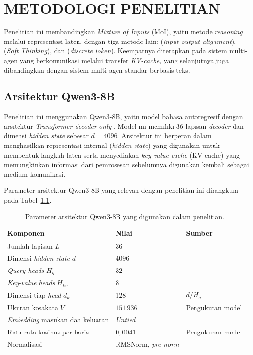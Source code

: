 \chapter{METODOLOGI PENELITIAN}

Penelitian ini membandingkan \textit{Mixture of Inputs} (MoI), yaitu
metode \textit{reasoning} melalui representasi laten, dengan tiga metode
lain:  (\textit{input-output alignment}), 
(\textit{Soft Thinking}), dan  (\textit{discrete token}). Keempatnya
diterapkan pada sistem multi-agen yang berkomunikasi melalui transfer
\textit{KV-cache}, yang selanjutnya juga dibandingkan dengan sistem
multi-agen standar berbasis teks.


\section{Arsitektur Qwen3-8B}
\label{sec:m-arsitektur}

Penelitian ini menggunakan Qwen3-8B, yaitu model bahasa autoregresif dengan arsitektur \textit{Transformer decoder-only} \citep{qwen3}. Model ini memiliki 36 lapisan \textit{decoder} dan dimensi \textit{hidden state} sebesar $d=4096$. Arsitektur ini berperan dalam menghasilkan representasi internal (\textit{hidden state}) yang digunakan untuk membentuk langkah laten serta menyediakan \textit{key-value cache} (KV-cache) yang memungkinkan informasi dari pemrosesan sebelumnya digunakan kembali sebagai medium komunikasi.

Parameter arsitektur Qwen3-8B yang relevan dengan penelitian ini dirangkum pada Tabel~\ref{tab:m-arsitektur}.

\begin{table}[H]
    \centering
    \caption{Parameter arsitektur Qwen3-8B yang digunakan dalam penelitian.}
    \label{tab:m-arsitektur}
    \small
    \begin{tabular}{lll}
        \hline
        Komponen & Nilai & Sumber \\
        \hline
        Jumlah lapisan $L$ & $36$ & \citet{qwen3} \\
        Dimensi \textit{hidden state} $d$ & $4096$ & \citet{qwen3} \\
        \textit{Query heads} $H_q$ & $32$ & \citet{qwen3} \\
        \textit{Key-value heads} $H_{kv}$ & $8$ & \citet{qwen3} \\
        Dimensi tiap \textit{head} $d_k$ & $128$ & $d/H_q$ \\
        Ukuran kosakata $V$ & $151\,936$ & Pengukuran model \\
        \textit{Embedding} masukan dan keluaran & \textit{Untied} & \citet{qwen3} \\
        Rata-rata kosinus per baris & $0{,}0041$ & Pengukuran model \\
        Normalisasi & RMSNorm, \textit{pre-norm} & \citet{qwen3} \\
        \hline
    \end{tabular}
\end{table}

